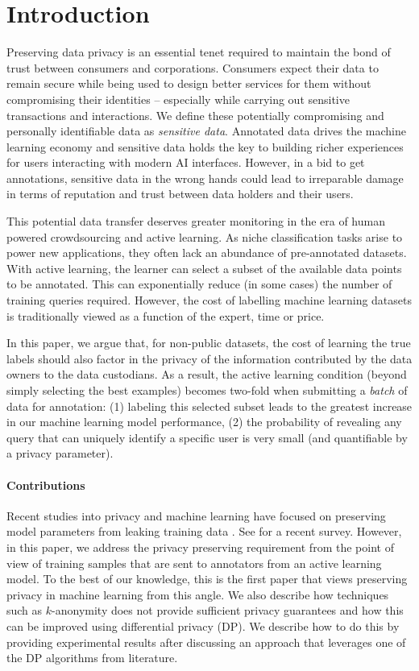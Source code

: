 \documentclass[letterpaper]{article}
\begin{document}
\section{Introduction}
Preserving data privacy is an essential tenet required to maintain the bond of trust between consumers and corporations. Consumers expect their data to remain secure while being used to design better services for them without compromising their identities -- especially while carrying out sensitive transactions and interactions. We define these potentially compromising and personally identifiable data as \textit{sensitive data}. Annotated data drives the machine learning economy and sensitive data holds the key to building richer experiences for users interacting with modern AI interfaces. However, in a bid to get annotations, sensitive data in the wrong hands could lead to irreparable damage in terms of reputation and trust between data holders and their users. 

This potential data transfer deserves greater monitoring in the era of  human powered crowdsourcing and active learning. As niche classification tasks arise to power new applications, they often lack an abundance of pre-annotated datasets. With active learning, the learner can select a subset of the available data points to be annotated. This can exponentially reduce \cite{settles1648active} (in some cases) the number of training queries required. However, the cost \cite{dasgupta2011two,arora2009estimating,settles1648active} of labelling machine learning datasets is traditionally viewed as a function of the expert, time or price.

In this paper, we argue that, for non-public datasets, the cost of learning the true labels should also factor in the privacy of the information contributed by the data owners to the data custodians. As a result, the active learning condition (beyond simply selecting the best examples) becomes two-fold when submitting a \textit{batch} of data for annotation: (1) labeling this selected subset leads to the greatest increase in our machine learning model performance, (2) the probability of revealing any query that can uniquely identify a specific user is very small (and quantifiable by a privacy parameter). 

\paragraph{Contributions} 
Recent studies into privacy and machine learning have focused on preserving model parameters from leaking training data \cite{papernot2016semi,hamm2016learning}. See \cite{ji2014differential} for a recent survey. However, in this paper, we address the privacy preserving requirement from the point of view of training samples that are sent to annotators from an active learning model. To the best of our knowledge, this is the first paper that views preserving privacy in machine learning from this angle. We also describe how techniques such as $k$-anonymity does not provide sufficient privacy guarantees and how this can be improved using differential privacy (DP). We describe how to do this by providing experimental results after discussing an approach that leverages one of the DP algorithms from literature. 
\end{document}
